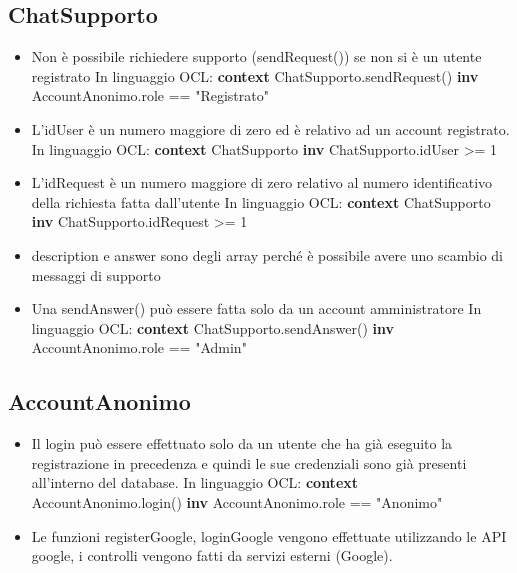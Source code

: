 \documentclass[a4paper,12pt]{article}
\begin{document}
\subsection{ChatSupporto}
\begin{itemize}
    \item Non è possibile richiedere supporto (sendRequest()) se non si è un utente registrato
    \newline \newline In linguaggio OCL:\newline
    \textbf{context} ChatSupporto.sendRequest() 
    \textbf{inv} AccountAnonimo.role == "Registrato"
    \item L'idUser è un numero maggiore di zero ed è relativo ad un account registrato. \newline \newline In linguaggio OCL:\newline
    \textbf{context} ChatSupporto
    \textbf{inv} ChatSupporto.idUser >= 1
    \item L'idRequest è un numero maggiore di zero relativo al numero identificativo della richiesta fatta dall'utente \newline \newline In linguaggio OCL:\newline
    \textbf{context} ChatSupporto
    \textbf{inv} ChatSupporto.idRequest >= 1
    \item description e answer sono degli array perché è possibile avere uno scambio di messaggi di supporto     
    \item  Una sendAnswer() può essere fatta solo da un account amministratore \newline \newline In linguaggio OCL:\newline
    \textbf{context} ChatSupporto.sendAnswer() 
    \textbf{inv} AccountAnonimo.role == "Admin"
\end{itemize}

\subsection{AccountAnonimo}
\begin{itemize}
    \item Il login può essere effettuato solo da un utente che ha già eseguito la registrazione in precedenza e quindi le sue credenziali sono già presenti all'interno del database. \newline \newline In linguaggio OCL:\newline
    \textbf{context} AccountAnonimo.login() \newline
    \textbf{inv} AccountAnonimo.role == "Anonimo"
    
    \item Le funzioni registerGoogle, loginGoogle vengono effettuate utilizzando le API google, i controlli vengono fatti da servizi esterni (Google).
\end{itemize}
\end{document}
